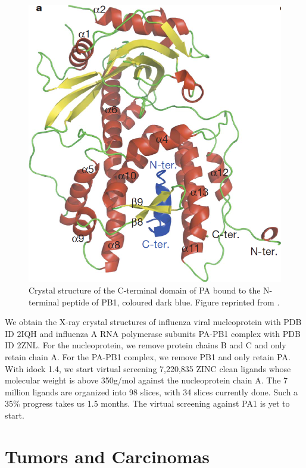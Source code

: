 \begin{figure}
\centering
\includegraphics[width=\linewidth]{Case/InfluenzaPAPB1.png}
\caption{Crystal structure of the C-terminal domain of PA bound to the N-terminal peptide of PB1, coloured dark blue. Figure reprinted from \citep{1141}.}
\label{Case:InfluenzaPAPB1}
\end{figure}

We obtain the X-ray crystal structures of influenza viral nucleoprotein with PDB ID 2IQH and influenza A RNA polymerase subunits PA-PB1 complex with PDB ID 2ZNL. For the nucleoprotein, we remove protein chains B and C and only retain chain A. For the PA-PB1 complex, we remove PB1 and only retain PA. With idock 1.4, we start virtual screening 7,220,835 ZINC \citep{532} clean ligands whose molecular weight is above 350g/mol against the nucleoprotein chain A. The 7 million ligands are organized into 98 slices, with 34 slices currently done. Such a 35\% progress takes us 1.5 months. The virtual screening against PA1 is yet to start.


\section{Tumors and Carcinomas}

